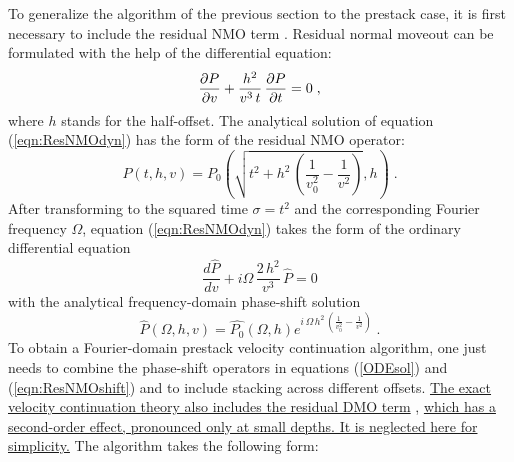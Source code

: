 To generalize the algorithm of the previous section to the prestack case, it is
first necessary to include the residual NMO term \cite{first}.  Residual normal
moveout can be formulated with the help of the differential equation:
\begin{equation}
{{\partial P} \over {\partial v}} + 
{{h^2} \over {v^3\,t}}\,{{\partial P} \over {\partial t}} = 0\;,
\label{eqn:ResNMOdyn} 
\end{equation}
where $h$ stands for the half-offset.  The analytical solution of
equation (\ref{eqn:ResNMOdyn}) has the form of the residual NMO
operator:
\begin{equation}
  P(t,h,v) = P_0\left(\sqrt{t^2 + h^2\,
    \left(\frac{1}{v_0^2} - \frac{1}{v^2}\right)},h\right)\;.
\label{eqn:ResNMOsol} 
\end{equation}
After transforming to the squared time $\sigma = t^2$ and the
corresponding Fourier frequency $\Omega$, equation
(\ref{eqn:ResNMOdyn}) takes the form of the ordinary differential
equation
\begin{equation}
  \frac{d \hat{P}}{d v} + 
  i \Omega\,\frac{2\,h^2}{v^3}\,\hat{P} = 0
\label{eqn:FFTResNMO} 
\end{equation}
with the analytical frequency-domain phase-shift solution
\begin{equation}
  \hat{P} (\Omega, h, v) = \hat{P_0} (\Omega,h) e^{i\,\Omega\,h^2\,
    \left(\frac{1}{v_0^2} - \frac{1}{v^2}\right)}\;.
\label{eqn:ResNMOshift} 
\end{equation}
To obtain a Fourier-domain prestack velocity continuation algorithm, one just
needs to combine the phase-shift operators in equations (\ref{ODEsol}) and
(\ref{eqn:ResNMOshift}) and to include stacking across different offsets. 
\uline{The
exact velocity continuation theory also includes the residual DMO term}
\cite{first}, \uline{which has a second-order effect, pronounced only at small
depths. It is neglected here for simplicity.}  The algorithm takes the
following form:
